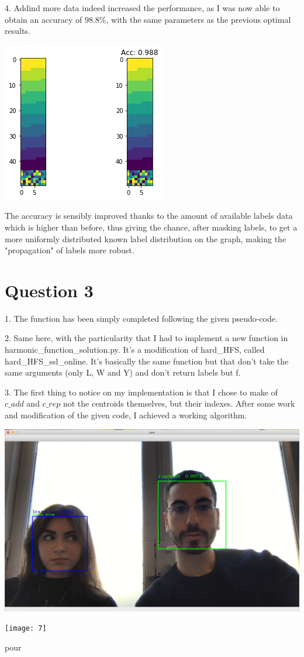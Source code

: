 \documentclass{article}
\begin{document}
4. Addind more data indeed increased the performance, as I was now able to obtain an accuracy of $98.8\%$, with the same parameters as the previous optimal results.
\begin{center}
	\includegraphics[scale=0.7]{6}
\end{center}

The accuracy is sensibly improved thanks to the amount of available labels data which is higher than before, thus giving the chance, after masking labels, to get a more uniformly distributed known label distribution on the graph, making the "propagation" of labels more robust.

\section{Question 3}
1. The function has been simply completed following the given pseudo-code.
\\ \newline

2. Same here, with the particularity that I had to implement a new function in harmonic\_function\_solution.py. It's a modification of hard\_HFS, called hard\_HFS\_ssl\_online. It's basically the same function but that don't take the same arguments (only L, W and Y) and don't return labels but f.
\\ \newline

3. The first thing to notice on my implementation is that I chose to make of $c\_add$ and $c\_rep$ not the centroids themselves, but their indexes.
After some work and modification of the given code, I achieved a working algorithm.


\begin{center}
	\includegraphics[scale=0.15]{0}
\end{center}

\begin{center}
	\texttt{[image: 7]}
\end{center}

pour 
\end{document}
